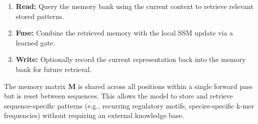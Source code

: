 \documentclass[journal,10pt]{IEEEtran}
\begin{document}
\begin{enumerate}
    \item \textbf{Read:} Query the memory bank using the current context to retrieve relevant stored patterns.
    \item \textbf{Fuse:} Combine the retrieved memory with the local SSM update via a learned gate.
    \item \textbf{Write:} Optionally record the current representation back into the memory bank for future retrieval.
\end{enumerate}

The memory matrix $\bm{M}$ is shared across all positions within a single forward pass but is reset between sequences. This allows the model to store and retrieve sequence-specific patterns (e.g., recurring regulatory motifs, species-specific k-mer frequencies) without requiring an external knowledge base.
\end{document}
